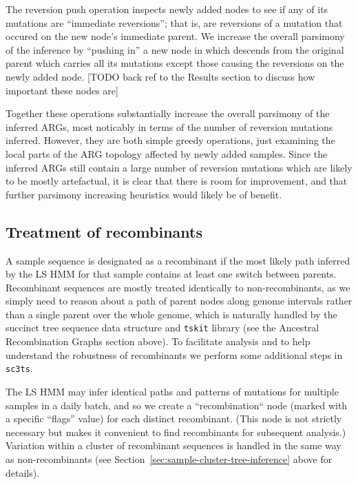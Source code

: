 \documentclass{article}
\begin{document}
The reversion push operation inspects newly added nodes to see
if any of its mutations are ``immediate reversions''; that is,
are reversions of a mutation that occured on the new node's
immediate parent. We increase the overall parsimony of the
inference by ``pushing in'' a new node in which descends from the
original parent which carries all its mutations except those
causing the reversions on the newly added node.
[TODO back ref to the
Results section to discuss how important these nodes are]

Together these operations substantially increase the overall parsimony
of the inferred ARGs, most noticably in terms of the number of
reversion mutations inferred. However, they are both simple
greedy operations, just examining the local parts of the
ARG topology affected by newly added samples. Since the inferred
ARGs still contain a large number of reversion mutations which
are likely to be mostly artefactual, it is clear that there
is room for improvement, and that further parsimony increasing
heuristics would likely be of benefit.

\subsection{Treatment of recombinants}
A sample sequence is designated as a recombinant if the most likely
path inferred by the LS HMM for that sample contains at least
one switch between parents. Recombinant sequences are mostly treated
identically to non-recombinants, as we simply need to reason about
a path of parent nodes along genome intervals rather than a
single parent over the whole genome, which is naturally handled by
the succinct tree sequence data structure and \texttt{tskit} library
(see the Ancestral Recombination Graphs section above). To facilitate
analysis and to help understand the robustness of recombinants
we perform some additional steps in \texttt{sc3ts}.

The LS HMM may infer identical paths and patterns of mutations
for multiple samples in a daily batch, and so we
create a ``recombination`` node (marked with a specific ``flags'' value)
for each distinct recombinant. (This node is not strictly necessary
but makes it convenient to find recombinants for subsequent analysis.)
Variation within a cluster
of recombinant sequences is handled in the same way as non-recombinants
(see Section~\ref{sec:sample-cluster-tree-inference} above for details).
\end{document}
